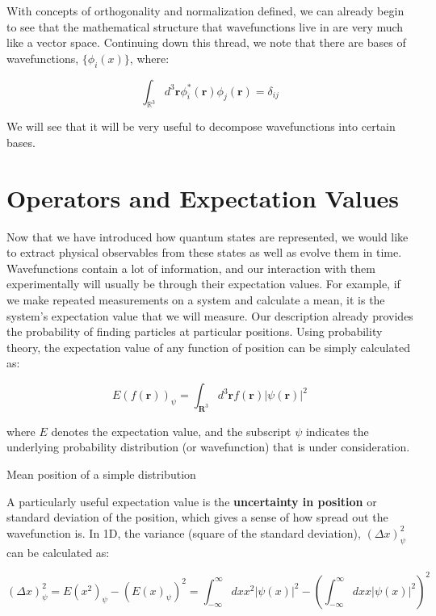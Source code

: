 With concepts of orthogonality and normalization defined, we can already begin to see that the mathematical structure that wavefunctions live in are very much like a vector space. Continuing down this thread, we note that there are bases of wavefunctions, $\{\phi_i(x)\}$, where:

\begin{equation}
	\int_{\mathbb{R}^3}d^3\mathbf{r}\phi_i^*(\mathbf{r})\phi_j(\mathbf{r}) = \delta_{ij}
\end{equation}

We will see that it will be very useful to decompose wavefunctions into certain bases. 

\section{Operators and Expectation Values}

Now that we have introduced how quantum states are represented, we would like to extract physical observables from these states as well as evolve them in time. Wavefunctions contain a lot of information, and our interaction with them experimentally will usually be through their expectation values. For example, if we make repeated measurements on a system and calculate a mean, it is the system's expectation value that we will measure. Our description already provides the probability of finding particles at particular positions. Using probability theory, the expectation value of any function of position can be simply calculated as:

\begin{equation}
	E(f(\mathbf{r}))_{\psi} = \int_{\mathbf{R}^3} d^3\mathbf{r} f(\mathbf{r}) |\psi(\mathbf{r})|^2
\end{equation}

where $E$ denotes the expectation value, and the subscript $\psi$ indicates the underlying probability distribution (or wavefunction) that is under consideration. 

\begin{example}
	Mean position of a simple distribution
\end{example}

A particularly useful expectation value is the \textbf{uncertainty in position} or standard deviation of the position, which gives a sense of how spread out the wavefunction is. In 1D, the variance (square of the standard deviation), $(\Delta x)^2_{\psi} $ can be calculated as:

\begin{equation}
	(\Delta x)^2_{\psi} = E(x^2)_{\psi} - (E(x)_{\psi})^2 = \int_{-\infty}^{\infty} dx x^2 |\psi(x)|^2 - \left(\int_{-\infty}^{\infty} dx x |\psi(x)|^2 \right)^2
\end{equation}

